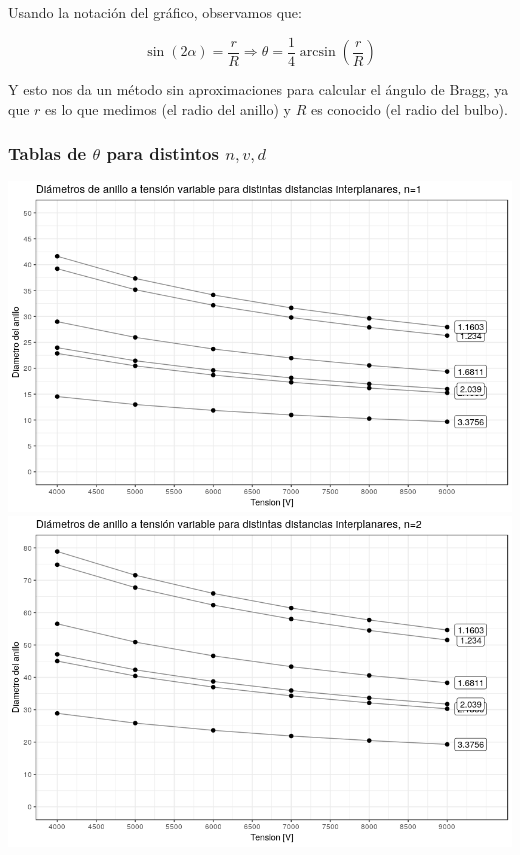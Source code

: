 \documentclass[]{article}
\begin{document}
Usando la notación del gráfico, observamos que:

\[\sin (2\alpha) = \frac{r}{R} \Rightarrow \theta = \frac{1}{4}
\arcsin\left (\frac{r}{R} \right )\]

Y esto nos da un método sin aproximaciones para calcular el ángulo de
Bragg, ya que \(r\) es lo que medimos (el radio del anillo) y \(R\) es
conocido (el radio del bulbo).

\hypertarget{tablas-de-theta-para-distintos-n-v-d}{%
\subsubsection{\texorpdfstring{Tablas de \(\theta\) para distintos
\(n, v, d\)}{Tablas de \textbackslash{}theta para distintos n, v, d}}\label{tablas-de-theta-para-distintos-n-v-d}}

\includegraphics{nivel_1.png} \includegraphics{nivel_2.png}
\end{document}
